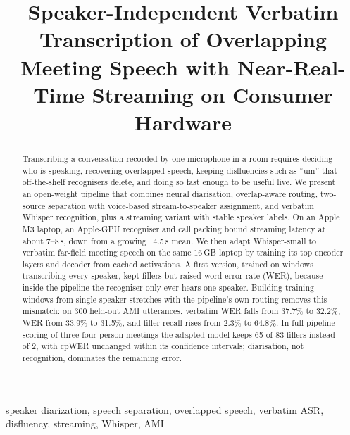 \documentclass[conference]{IEEEtran}
\begin{document}
\title{Speaker-Independent Verbatim Transcription of Overlapping Meeting Speech with Near-Real-Time Streaming on Consumer Hardware}

\author{
}

\maketitle

\begin{abstract}
Transcribing a conversation recorded by one microphone in a room requires deciding who is speaking, recovering overlapped speech, keeping disfluencies such as ``um'' that off-the-shelf recognisers delete, and doing so fast enough to be useful live. We present an open-weight pipeline that combines neural diarisation, overlap-aware routing, two-source separation with voice-based stream-to-speaker assignment, and verbatim Whisper recognition, plus a streaming variant with stable speaker labels. On an Apple M3 laptop, an Apple-GPU recogniser and call packing bound streaming latency at about 7--8\,s, down from a growing 14.5\,s mean. We then adapt Whisper-small to verbatim far-field meeting speech on the same 16\,GB laptop by training its top encoder layers and decoder from cached activations. A first version, trained on windows transcribing every speaker, kept fillers but raised word error rate (WER), because inside the pipeline the recogniser only ever hears one speaker. Building training windows from single-speaker stretches with the pipeline's own routing removes this mismatch: on 300 held-out AMI utterances, verbatim WER falls from 37.7\% to 32.2\%, WER from 33.9\% to 31.5\%, and filler recall rises from 2.3\% to 64.8\%. In full-pipeline scoring of three four-person meetings the adapted model keeps 65 of 83 fillers instead of 2, with cpWER unchanged within its confidence intervals; diarisation, not recognition, dominates the remaining error.
\end{abstract}

\begin{IEEEkeywords}
speaker diarization, speech separation, overlapped speech, verbatim ASR, disfluency, streaming, Whisper, AMI
\end{IEEEkeywords}

\end{document}
